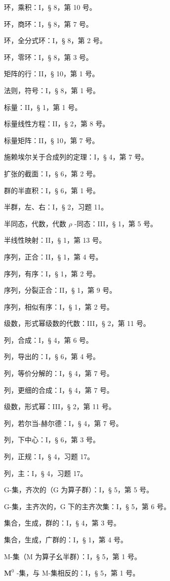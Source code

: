 环，乘积：I，§ 8，第 10 号。

环，商环：I，§ 8，第 7 号。

环，全分式环：I，§ 8，第 2 号。

环，零环：I，§ 8，第 3 号。

矩阵的行：II，§ 10，第 1 号。

法则，符号：I，§ 8，第 1 号。

标量：II，§ 1，第 1 号。

标量线性方程：II，§ 2，第 8 号。

标量矩阵：II，§ 10，第 7 号。

施赖埃尔关于合成列的定理：I，§ 4，第 7 号。

扩张的截面：I，§ 6，第 2 号。

群的半直积：I，§ 6，第 1 号。

半群，左、右：I，§ 2，习题 11。

半同态，代数，代数 \(\rho\) -同态：III，§ 1，第 5 号。

半线性映射：II，§ 1，第 13 号。

序列，正合：II，§ 1，第 4 号。

序列，有序：I，§ 1，第 2 号。

序列，分裂正合：II，§ 1，第 9 号。

序列，相似有序：I，§ 1，第 2 号。

级数，形式幂级数的代数：III，§ 2，第 11 号。

列，合成：I，§ 4，第 6 号。

列，导出的：I，§ 6，第 4 号。

列，等价分解的：I，§ 4，第 7 号。

列，更细的合成：I，§ 4，第 7 号。

级数，形式幂：III，§ 2，第 11 号。

列，若尔当-赫尔德：I，§ 4，第 7 号。

列，下中心：I，§ 6，第 3 号。

列，正规：I，§ 4，习题 17。

列，主：I，§ 4，习题 17。

G-集，齐次的（G 为算子群）：I，§ 5，第 5 号。

G-集，主齐次的，G 下的主齐次集：I，§ 5，第 6 号。

集合，生成，群的：I，§ 4，第 3 号。

集合，生成，广群的：I，§ 1，第 4 号。

M-集（M 为算子幺半群）：I，§ 5，第 1 号。

\(\mathbf{M}^0\) -集，与 M-集相反的：I，§ 5，第 1 号。

